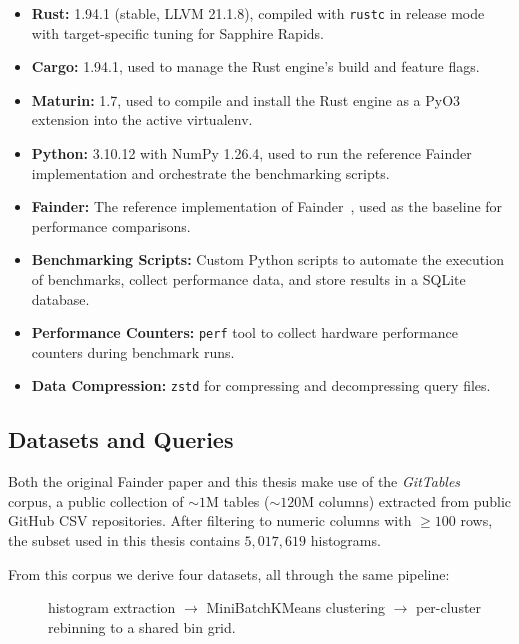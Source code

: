 \begin{itemize}
    \item \textbf{Rust:} 1.94.1 (stable, LLVM 21.1.8), compiled with \texttt{rustc} in release mode with target-specific tuning for Sapphire Rapids.
    \item \textbf{Cargo:} 1.94.1, used to manage the Rust engine's build and feature flags.
    \item \textbf{Maturin:} 1.7, used to compile and install the Rust engine as a PyO3 extension into the active virtualenv.
    \item \textbf{Python:} 3.10.12 with NumPy 1.26.4, used to run the reference Fainder implementation and orchestrate the benchmarking scripts.
    \item \textbf{Fainder:} The reference implementation of Fainder~\cite{behme_2024}, used as the baseline for performance comparisons.
    \item \textbf{Benchmarking Scripts:} Custom Python scripts to automate the execution of benchmarks, collect performance data, and store results in a SQLite database.
    \item \textbf{Performance Counters:} \texttt{perf} tool to collect hardware performance counters during benchmark runs.
    \item \textbf{Data Compression:} \texttt{zstd} for compressing and decompressing query files.
\end{itemize}

\subsection{Datasets and Queries\label{sec:method:data}}

Both the original Fainder paper and this thesis make use of the \emph{GitTables}~\cite{hulsebos_2023} corpus, a public collection of $\sim\!1$M tables ($\sim\!120$M columns) extracted from public GitHub CSV repositories. After filtering to numeric columns with $\geq 100$ rows, the subset used in this thesis contains $5{,}017{,}619$ histograms.

From this corpus we derive four datasets, all through the same pipeline:
\begin{description}
    \item[] histogram extraction $\to$ MiniBatchKMeans clustering $\to$ per-cluster rebinning to a shared bin grid.
\end{description}

